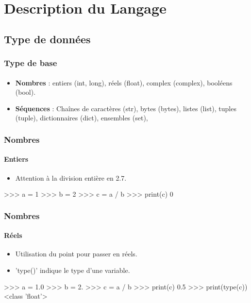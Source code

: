 \section{Description du Langage}
\subsection{Type de données}
\begin{frame}
\frametitle{Type de base}
\framesubtitle{}
\begin{itemize}
\item {\bfseries Nombres} : entiers (int, long), réels (float), complex (complex), booléens (bool). 
\item {\bfseries Séquences} : Chaînes de caractères (str), bytes (bytes), listes (list), tuples (tuple), dictionnaires (dict), ensembles (set), 
\end{itemize}
\end{frame}
\begin{frame}[fragile]
\frametitle{Nombres}
\framesubtitle{Entiers}
\begin{itemize}
 \item Attention à la division entière en 2.7. 
\end{itemize}
\begin{pythonConsole}
>>> a = 1  
>>> b = 2
>>> c = a / b
>>> print(c)
0
\end{pythonConsole}
\end{frame}
\begin{frame}[fragile]
\frametitle{Nombres}
\framesubtitle{Réels}
\begin{itemize}
 \item Utilisation du point pour passer en réels. 
 \item 'type()' indique le type d'une variable. 
\end{itemize}
\begin{pythonConsole}
>>> a = 1.0
>>> b = 2.
>>> c = a / b
>>> print(c)
0.5
>>> print(type(c))
<class 'float'>
\end{pythonConsole}
\end{frame}

